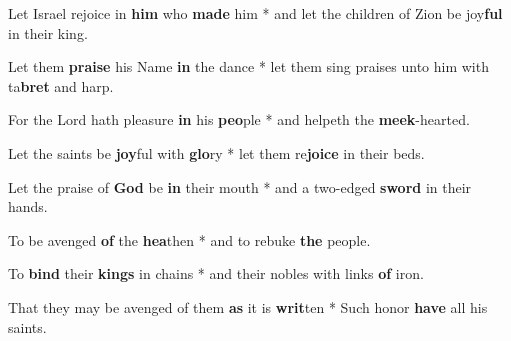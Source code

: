 \begin{multicols}{2}
	Let Israel rejoice in \textbf{him} who \textbf{made} him * and let the children of Zion be joy\textbf{ful} in their king.
	
	Let them \textbf{praise} his Name \textbf{in} the dance * let them sing praises unto him with ta\textbf{bret} and harp.
	
	For the Lord hath pleasure \textbf{in} his \textbf{peo}ple * and helpeth the \textbf{meek}-hearted.
	
	Let the saints be \textbf{joy}ful with \textbf{glo}ry * let them re\textbf{joice} in their beds.
	
	Let the praise of \textbf{God} be \textbf{in} their mouth * and a two-edged \textbf{sword} in their hands.
	
	To be avenged \textbf{of} the \textbf{hea}then * and to rebuke \textbf{the} people.
	
	To \textbf{bind} their \textbf{kings} in chains * and their nobles with links \textbf{of} iron.
	
	That they may be avenged of them \textbf{as} it is\textbf{ writ}ten * Such honor \textbf{have} all his saints.
\end{multicols}